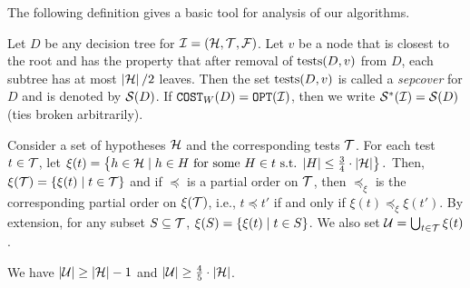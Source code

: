 The following definition gives a basic tool for analysis of our algorithms.
\begin{definition}[Sepcover]
  Let $D$ be any decision tree for $\mathcal{I}=\mathopen{}\left( \mathcal{H}, \mathcal{T}, \mathcal{F} \right)$.
  Let $v$ be a node that is closest to the root and has the property that after removal of $\operatorname{tests}(D,v)$ from $D$, each subtree has at most $\mathopen{}\left| \mathcal{H} \right|/2$ leaves.
  Then the set $\operatorname{tests}(D,v)$ is called a \emph{sepcover} for $D$ and is denoted by $\mathcal{S}\mathopen{}\left( D \right)$.
  If $\texttt{COST}_W\mathopen{}\left( D \right)=\texttt{OPT}\mathopen{}\left( \mathcal{I} \right)$, then we write $\mathcal{S}^*\mathopen{}\left( \mathcal{I} \right) = \mathcal{S}\mathopen{}\left( D \right)$ (ties broken arbitrarily).
\end{definition}
Consider a set of hypotheses $\mathcal{H}$ and the corresponding tests $\mathcal{T}$.
For each test $t\in\mathcal{T}$, let
$
\xi(t)=\mathopen{}\left\{ h\in\mathcal{H} \mid h\in H \textup{ for some }H\in t\textup{ s.t. }  \mathopen{}\left| H \right|\leq\frac{3}{4}\cdot\mathopen{}\left| \mathcal{H} \right| \right\}.
$
Then, $\xi(\mathcal{T})=\mathopen{}\left\{ \xi(t)\mid t\in\mathcal{T} \right\}$ and if $\preceq$ is a partial order on $\mathcal{T}$, then $\preceq_{\xi}$ is the corresponding partial order on $\xi(\mathcal{T})$, i.e., $t\preceq t'$ if and only if $\xi(t)\preceq_{\xi}\xi(t')$.
By extension, for any subset $S\subseteq\mathcal{T}$, $\xi(S)=\mathopen{}\left\{ \xi(t) \mid t\in S \right\}$.
We also set $\mathcal{U}=\bigcup_{t\in\mathcal{T}}\xi(t)$.
\begin{lemma}
    We have $\mathopen{}\left| \mathcal{U} \right|\geq \mathopen{}\left| \mathcal{H} \right|-1$ and $\mathopen{}\left| \mathcal{U} \right|\geq \frac{4}{5}\cdot\mathopen{}\left| \mathcal{H} \right|$.
\end{lemma}
 

